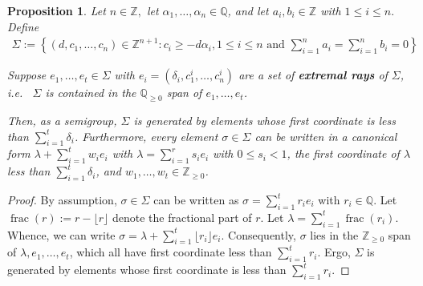 \documentclass{amsart}
\theoremstyle{plain}
\newtheorem{prop}[thm]{Proposition}
\theoremstyle{definition}
\theoremstyle{remark}
\numberwithin{equation}{section}
\newcommand\bq{{\mathbb Q}}
\newcommand\bz{{\mathbb Z}}
\newcommand\pdeg{\delta}
\DeclareMathOperator{\fr}{frac}
\begin{document}
\begin{prop}
\label{prop:cone-generation}
Let $n \in \bz,$ let $\alpha_1, \ldots, \alpha_n \in \bq$, and let
$a_i, b_i \in \bz$ with $1 \leq i \leq n.$ Define
\begin{align*}
	\Sigma := \left \{(d, c_1, \ldots, c_n) \in \bz^{n + 1} : c_i \geq -
	d \alpha_i, 1 \leq i \leq n \text{ and } \sum_{i = 1}^{n} a_i =
	\sum_{i	= 1}^{n}b_i = 0 \right \}
\end{align*}

\noindent
Suppose $e_1, \ldots, e_t \in \Sigma$ with $e_i = (\pdeg_i, c_1^i,
\ldots, c_n^i)$ are a set of {\bf extremal rays} of $\Sigma$,
i.e.~ $\Sigma$ is contained in the $\bq_{\geq 0}$ span of
$e_1, \ldots, e_t$.

Then, as a semigroup, $\Sigma$ is generated by
elements whose first coordinate is less than $\sum_{i = 1}^{t}
\pdeg_i$. Furthermore, every element $\sigma \in \Sigma$ can be
written in a canonical form $\lambda + \sum_{i = 1}^{t} w_i e_i$ 
with $\lambda = \sum_{i = 1}^{r} s_i e_i$ with $0 \leq s_i < 1$, the
first coordinate of $\lambda$ less than $\sum_{i=1}^{t}\pdeg_i$,
and $w_1, \ldots, w_t \in \bz_{\geq 0}$.
\end{prop}

\begin{proof}
By assumption, $\sigma \in \Sigma$ can be written as $\sigma = \sum_
{i = 1}^{t} r_i e_i$ with $r_i \in \bq$. Let $\fr(r) := r - \lfloor r
\rfloor$ denote the fractional part of $r$. Let $\lambda = \sum_{i = 1}
^{t} \fr(r_i)$. Whence, we can write $\sigma = \lambda + \sum_{i = 1}
^{t} \lfloor r_i \rfloor e_i.$ Consequently, $\sigma$ lies in the
$\bz_{\geq 0}$ span of $\lambda, e_1, \ldots, e_t$, which all have
first coordinate less than $\sum_{i=1}^{t} r_i$. Ergo, $\Sigma$ is
generated by elements whose first coordinate is less than
$\sum_{i = 1}^{t} r_i$.
\end{proof}
\end{document}
